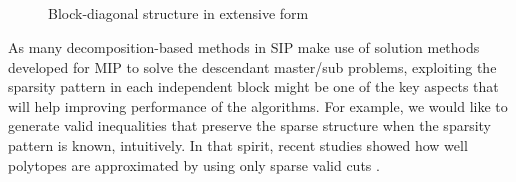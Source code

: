 \begin{figure}[]
	\centering
	~

	~
	
	~
	
	~
	
	\caption{Block-diagonal structure in extensive form}
	\label{fig:de_structure}
\end{figure}

As many decomposition-based methods in SIP make use of solution methods developed for MIP to solve the descendant master/sub problems, exploiting the sparsity pattern in each independent block might be one of the key aspects that will help improving performance of the algorithms. For example, we would like to generate valid inequalities that preserve the sparse structure when the sparsity pattern is known, intuitively. In that spirit, recent studies showed how well polytopes are approximated by using only sparse valid cuts \cite{journal:DMW2015,journal:DIM2015}.











